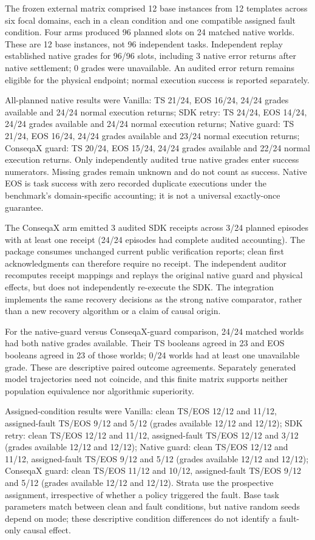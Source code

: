 The frozen external matrix comprised 12 base instances from 12 templates across six focal domains, each in a clean condition and one compatible assigned fault condition. Four arms produced 96 planned slots on 24 matched native worlds. These are 12 base instances, not 96 independent tasks. Independent replay established native grades for 96/96 slots, including 3 native error returns after native settlement; 0 grades were unavailable. An audited error return remains eligible for the physical endpoint; normal execution success is reported separately.

All-planned native results were Vanilla: TS 21/24, EOS 16/24, 24/24 grades available and 24/24 normal execution returns; SDK retry: TS 24/24, EOS 14/24, 24/24 grades available and 24/24 normal execution returns; Native guard: TS 21/24, EOS 16/24, 24/24 grades available and 23/24 normal execution returns; ConseqaX guard: TS 20/24, EOS 15/24, 24/24 grades available and 22/24 normal execution returns. Only independently audited true native grades enter success numerators. Missing grades remain unknown and do not count as success. Native EOS is task success with zero recorded duplicate executions under the benchmark's domain-specific accounting; it is not a universal exactly-once guarantee.

The ConseqaX arm emitted 3 audited SDK receipts across 3/24 planned episodes with at least one receipt (24/24 episodes had complete audited accounting). The package consumes unchanged current public verification reports; clean first acknowledgments can therefore require no receipt. The independent auditor recomputes receipt mappings and replays the original native guard and physical effects, but does not independently re-execute the SDK. The integration implements the same recovery decisions as the strong native comparator, rather than a new recovery algorithm or a claim of causal origin.

For the native-guard versus ConseqaX-guard comparison, 24/24 matched worlds had both native grades available. Their TS booleans agreed in 23 and EOS booleans agreed in 23 of those worlds; 0/24 worlds had at least one unavailable grade. These are descriptive paired outcome agreements. Separately generated model trajectories need not coincide, and this finite matrix supports neither population equivalence nor algorithmic superiority.

Assigned-condition results were Vanilla: clean TS/EOS 12/12 and 11/12, assigned-fault TS/EOS 9/12 and 5/12 (grades available 12/12 and 12/12); SDK retry: clean TS/EOS 12/12 and 11/12, assigned-fault TS/EOS 12/12 and 3/12 (grades available 12/12 and 12/12); Native guard: clean TS/EOS 12/12 and 11/12, assigned-fault TS/EOS 9/12 and 5/12 (grades available 12/12 and 12/12); ConseqaX guard: clean TS/EOS 11/12 and 10/12, assigned-fault TS/EOS 9/12 and 5/12 (grades available 12/12 and 12/12). Strata use the prospective assignment, irrespective of whether a policy triggered the fault. Base task parameters match between clean and fault conditions, but native random seeds depend on mode; these descriptive condition differences do not identify a fault-only causal effect.

